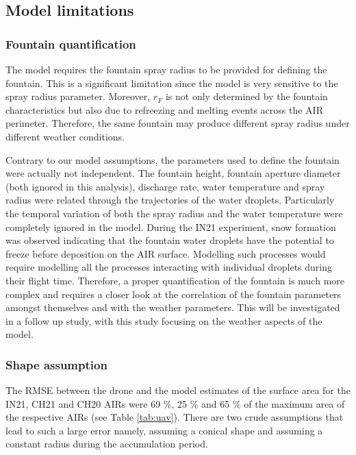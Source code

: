 \documentclass[utf8]{frontiersSCNS}
\begin{document}
\subsection{Model limitations}
\subsubsection{Fountain quantification}

The model requires the fountain spray radius to be provided for defining the fountain. This is a significant
limitation since the model is very sensitive to the spray radius parameter. Moreover, $r_F$ is not only
determined by the fountain characteristics but also due to refreezing and melting events across the AIR
perimeter. Therefore, the same fountain may produce different spray radius under different weather conditions.

Contrary to our model assumptions, the parameters used to define the fountain were actually not independent.
The fountain height, fountain aperture diameter (both ignored in this analysis), discharge rate, water
temperature and spray radius were related through the trajectories of the water droplets. Particularly the
temporal variation of both the spray radius and the water temperature were completely ignored in the model.
During the IN21 experiment, snow formation was observed indicating that the fountain water droplets have the
potential to freeze before deposition on the AIR surface. Modelling such processes would require modelling all
the processes interacting with individual droplets during their flight time. Therefore, a proper quantification
of the fountain is much more complex and requires a closer look at the correlation of the fountain parameters
amongst themselves and with the weather parameters. This will be investigated in a follow up study, with this
study focusing on the weather aspects of the model.

\subsubsection{Shape assumption}

The RMSE between the drone and the model estimates of the surface area for the IN21, CH21 and CH20 AIRs were 69
\%, 25 \% and 65 \% of the maximum area of the respective AIRs (see Table \ref{tab:uav}). There are two crude
assumptions that lead to such a large error namely, assuming a conical shape and assuming a constant radius
during the accumulation period.
\end{document}
